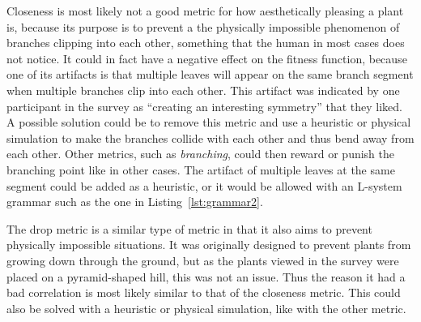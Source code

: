 Closeness is most likely not a good metric for how aesthetically pleasing a plant is, because its purpose is to prevent a the physically impossible phenomenon of branches clipping into each other, something that the human in most cases does not notice.
It could in fact have a negative effect on the fitness function, because one of its artifacts is that multiple leaves will appear on the same branch segment when multiple branches clip into each other.
This artifact was indicated by one participant in the survey as ``creating an interesting symmetry'' that they liked.
A possible solution could be to remove this metric and use a heuristic or physical simulation to make the branches collide with each other and thus bend away from each other.
Other metrics, such as \textit{branching}, could then reward or punish the branching point like in other cases.
The artifact of multiple leaves at the same segment could be added as a heuristic, or it would be allowed with an \gls{L-system} grammar such as the one in Listing~\ref{lst:grammar2}.

The drop metric is a similar type of metric in that it also aims to prevent physically impossible situations.
It was originally designed to prevent plants from growing down through the ground, but as the plants viewed in the survey were placed on a pyramid-shaped hill, this was not an issue.
Thus the reason it had a bad correlation is most likely similar to that of the closeness metric.
This could also be solved with a heuristic or physical simulation, like with the other metric.

